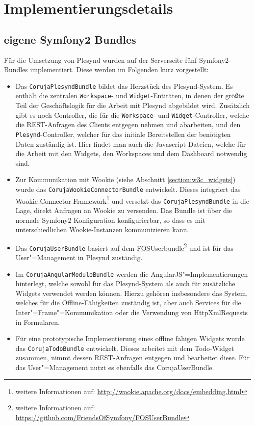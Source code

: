 \section{Implementierungsdetails}\label{section:implementierungsdetails}

\subsection{eigene Symfony2 Bundles}\label{section:backend}
Für die Umsetzung von Plesynd wurden auf der Serverseite fünf Symfony2-Bundles implementiert. Diese werden im Folgenden kurz vorgestellt:

\begin{itemize}
\item Das \texttt{CorujaPlesyndBundle} bildet das Herzstück des Plesynd-System. Es enthält die zentralen \texttt{Workspace}- und \texttt{Widget}-Entitäten, in denen der größte Teil der Geschäftslogik für die Arbeit mit Plesynd abgebildet wird. Zusätzlich gibt es noch Controller, die für die \texttt{Workspace}- und \texttt{Widget}-Controller, welche die REST-Anfragen des Clients entgegen nehmen und abarbeiten, und den \texttt{Plesynd}-Controller, welcher für das initiale Bereitstellen der benötigten Daten zuständig ist. Hier findet man auch die Javascript-Dateien, welche für die Arbeit mit den Widgets, den Workspaces und dem Dashboard notwendig sind.
\item Zur Kommunikation mit Wookie (siehe Abschnitt \ref{section:w3c_widgets}) wurde das \texttt{Coruja\allowbreak Wookie\allowbreak Connector\allowbreak Bundle} entwickelt. Dieses integriert das \href{http://wookie.apache.org/docs/embedding.html}{Wookie Connector Framework}\footnote{weitere Informationen auf: \url{http://wookie.apache.org/docs/embedding.html}} und versetzt das \texttt{CorujaPlesyndBundle} in die Lage, direkt Anfragen an Wookie zu versenden. Das Bundle ist über die normale Symfony2 Konfiguration konfigurierbar, so dass es mit unterschiedlichen Wookie-Instanzen kommunizieren kann.
\item Das \texttt{CorujaUserBundle} basiert auf dem \href{https://github.com/FriendsOfSymfony/FOSUserBundle}{FOSUserbundle}\footnote{weitere Informationen auf: \url{https://github.com/FriendsOfSymfony/FOSUserBundle}} und ist für das User"=Management in Plesynd zuständig.
\item Im \texttt{Coruja\allowbreak Angular\allowbreak Module\allowbreak Bundle} werden die AngularJS"=Implementierungen hinterlegt, welche sowohl für das Plesynd-System als auch für zusätzliche Widgets verwendet werden können. Hierzu gehören insbesondere das System, welches für die Offline-Fähigkeiten zuständig ist, aber auch Services für die Inter"=Frame"=Kommunikation oder die Verwendung von Http\allowbreak Xml\allowbreak Requests in Formularen.  
\item Für eine prototypische Implementierung eines offline fähigen Widgets wurde das \texttt{CorujaTodoBundle} entwickelt. Dieses arbeitet mit dem Todo-Widget zusammen, nimmt dessen REST-Anfragen entgegen und bearbeitet diese. Für das User"=Management nutzt es ebenfalls das CorujaUserBundle.
\end{itemize}

